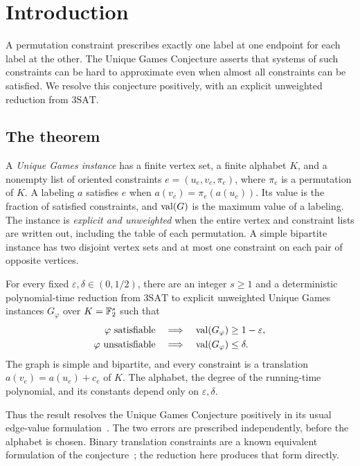 \section{Introduction}\label{sec:introduction}

A permutation constraint prescribes exactly one label at one endpoint for
each label at the other. The Unique Games Conjecture asserts that systems
of such constraints can be hard to approximate even when almost all
constraints can be satisfied. We resolve this conjecture positively, with an
explicit unweighted reduction from \(\mathrm{3SAT}\).

\subsection{The theorem}

A \emph{Unique Games instance} has a finite vertex set, a finite alphabet
\(K\), and a nonempty list of oriented constraints
\(e=(u_e,v_e,\pi_e)\), where \(\pi_e\) is a permutation of \(K\).
A labeling \(a\) satisfies \(e\) when
\(a(v_e)=\pi_e(a(u_e))\). Its value is the fraction of satisfied
constraints, and \(\operatorname{val}(G)\) is the maximum value of a labeling.
The instance is \emph{explicit and unweighted} when the entire vertex
and constraint lists are written out, including the table of each
permutation. A simple bipartite instance has two disjoint vertex sets
and at most one constraint on each pair of opposite vertices.

\begin{theorem}\label{thm:ugc}
For every fixed \(\varepsilon,\delta\in(0,1/2)\), there are an integer
\(s\ge1\) and a deterministic polynomial-time reduction from
\(\mathrm{3SAT}\) to explicit unweighted Unique Games instances
\(G_\varphi\) over \(K=\mathbb F_2^s\) such that
\[
\begin{aligned}
 \varphi\text{ satisfiable}
 &\quad\Longrightarrow\quad \operatorname{val}(G_\varphi)\ge1-\varepsilon,\\
 \varphi\text{ unsatisfiable}
 &\quad\Longrightarrow\quad \operatorname{val}(G_\varphi)\le\delta.
\end{aligned}
\]
The graph is simple and bipartite, and every constraint is a translation
\(a(v_e)=a(u_e)+c_e\) of \(K\). The alphabet, the degree of the
running-time polynomial, and its constants depend only on
\(\varepsilon,\delta\).
\end{theorem}

Thus the result resolves the Unique Games Conjecture positively in its
usual edge-value formulation~\cite[Conjecture~2.5]{Khot10}.
The two errors are prescribed independently, before the alphabet is chosen.
Binary translation constraints are a known equivalent formulation of the
conjecture~\cite[Corollary~13 and Section~11.1]{KKMO07}; the reduction
here produces that form directly.


